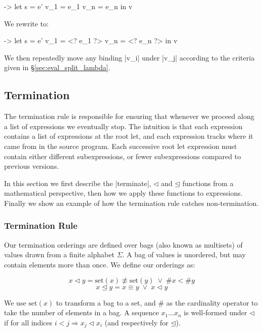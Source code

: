 \documentclass[draft]{sigplanconf}
\newcommand{\set}{\mathrm{set}}
\newcommand{\veeskip}{\;\vee\;}
\begin{document}
\begin{code}
\free ->  let  s    = e'
               v_1  = e_1
               v_n  = e_n
          in   v
\end{code}

We rewrite to:

\begin{code}
\free ->  let  s    = e'
               v_1  = <? e_1 ?>
               v_n  = <? e_n ?>
          in   v
\end{code}

We then repeatedly move any binding |v_i| under |v_j| according to the criteria given in \S\ref{sec:eval_split_lambda}.

\subsection{Termination}
\label{sec:term}

The termination rule is responsible for ensuring that whenever we proceed along a list of expressions we eventually stop. The intuition is that each expression contains a list of expressions at the root let, and each expression tracks where it came from in the source program. Each successive root let expression must contain either different subexpressions, or fewer subexpressions compared to previous versions.

In this section we first describe the |terminate|, $\lhd$ and $\unlhd$ functions from a mathematical perspective, then how we apply these functions to expressions. Finally we show an example of how the termination rule catches non-termination.

\subsubsection{Termination Rule}
\label{sec:term_rule}

Our termination orderings are defined over bags (also known as multisets) of values drawn from a finite alphabet $\Sigma$. A bag of values is unordered, but may contain elements more than once. We define our orderings as:

\[
x \lhd y = \set(x) \not\equiv \set(y)  \veeskip \# x < \# y
\]
\[
x \unlhd y = x \equiv y \veeskip x \lhd y
\]

We use $\set(x)$ to transform a bag to a set, and $\#$ as the cardinality operator to take the number of elements in a bag. A sequence $x_1 \ldots x_n$ is well-formed under $\lhd$ if for all indices $i < j \Rightarrow x_j \lhd x_i$ (and respectively for $\unlhd$).
\end{document}
